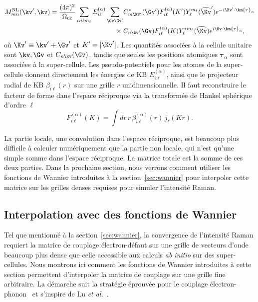 \begin{equation}
\begin{aligned}
    M_{mn}^\text{NL}(\kv',\kv) = \frac{(4\pi)^2}{\Omega_\text{uc}}\sum_{\alpha i\ell m_\ell}E_{i\ell}^{(\alpha)}\sum_{\Gv\Gv'}
    &C_{m\kv'}^*(\Gv')F_{i\ell}^{(\alpha)}(K')Y_{\ell}^{m_\ell}(\widehat{\Kv}')e^{-i\Kv'\cdot\bm{\tau}_{\alpha}}\\
    \times\;&C_{n\kv}(\Gv)F_{i\ell}^{(\alpha)}(K)Y_\ell^{*m_\ell}(\widehat{\Kv})e^{i\Kv\cdot\bm{\tau}_\alpha},\label{eqn:MNL_final}
\end{aligned}
\end{equation}
où $\Kv'\equiv \kv'+\Gv'$ et $K'=|\Kv'|$. Les quantités associées à la cellule unitaire sont $\kv, \Gv$ et $C_{n\kv}(\Gv)$, tandis que seules les positions atomiques $\bm{\tau}_\alpha$ sont associées à la super-cellule. Les pseudo-potentiels pour les atomes de la super-cellule donnent directement les énergies de KB $E_{i\ell}^{(\alpha)}$, ainsi que le projecteur radial de KB $\beta_{i\ell}(r)$ sur une grille $r$ unidimensionnelle. Il faut reconstruire le facteur de forme dans l'espace réciproque via la transformée de Hankel sphérique d'ordre $\ell$
\begin{equation}
    F_{i\ell}^{(\alpha)}(K)=\int dr\,r\,\beta_{i\ell}^{(\alpha)}(r)\,j_\ell(Kr).\label{eqn:Hankel_sphérique}
\end{equation}

La partie locale, une convolution dans l'espace réciproque, est beaucoup plus difficile à calculer numériquement que la partie non locale, qui n'est qu'une simple somme dans l'espace réciproque. La matrice totale est la somme de ces deux parties. Dans la prochaine section, nous verrons comment utiliser les fonctions de Wannier introduites à la section~\ref{sec:wannier} pour interpoler cette matrice sur les grilles denses requises pour simuler l'intensité Raman.

\subsection{Interpolation avec des fonctions de Wannier}\label{sec:interp_wannier_M}

Tel que mentionné à la section~\ref{sec:wannier}, la convergence de
l'intensité Raman requiert la matrice de couplage électron-défaut sur une
grille de vecteurs d'onde beaucoup plus dense que celle accessible aux
calculs \textit{ab initio} sur des super-cellules. Nous montrons ici comment les
fonctions de Wannier introduites à cette section permettent d'interpoler
la matrice de couplage sur une grille fine arbitraire. La démarche suit
la stratégie éprouvée pour le couplage électron-phonon~\cite{giustinoElectronphononInteractionUsing2007} et s'inspire de Lu \textit{et al.}~\cite{luInitioElectrondefectInteractions2020}.

